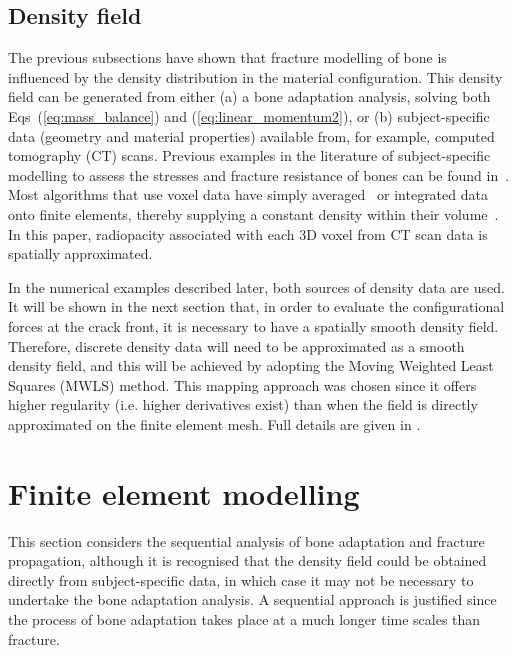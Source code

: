 \documentclass[twocolumn]{svjour3}
\begin{document}
\subsection{Density field}
\label{sec:dens_mapping}
The previous subsections have shown that  fracture modelling of bone is influenced by the density distribution in the material configuration. This density field can be generated from either (a) a bone adaptation analysis, solving both Eqs~(\ref{eq:mass_balance}) and (\ref{eq:linear_momentum2}), or (b) subject-specific data (geometry and material properties) available from, for example, computed tomography (CT) scans. Previous examples in the literature of subject-specific modelling to assess the stresses and fracture resistance of bones can be found in~\cite{poelert2013patient,Helgason2008b,yosibash2010predicting}. Most algorithms that use voxel data have simply averaged~\cite{zannoni1999material} or integrated data onto finite elements, thereby supplying a constant density within their volume~\cite{taddei2007material, schileo2008subject}. In this paper, radiopacity associated with each 3D voxel from CT scan data is spatially approximated. 

In the numerical examples described later, both sources of density data are used. It will be shown in the next section that, in order to evaluate the configurational forces at the crack front, it is necessary to have a spatially smooth density field. Therefore, discrete density data will need to be approximated as a smooth density field, and this will be achieved by adopting the Moving Weighted Least Squares (MWLS) method. This mapping approach was chosen since it offers higher regularity (i.e. higher derivatives exist) than when the field is
directly approximated on the finite element mesh. Full details are given in \cite{karol_lewandowski_moving_2019}.  %


\section{Finite element modelling} \label{sec:fem_modelling}

This section considers the sequential analysis of bone adaptation and fracture propagation, although it is recognised that the density field could be obtained directly from subject-specific data, in which case it may not be necessary to undertake the bone adaptation analysis. A sequential approach is justified since the process of bone adaptation takes place at a much longer time scales than fracture.
\end{document}
